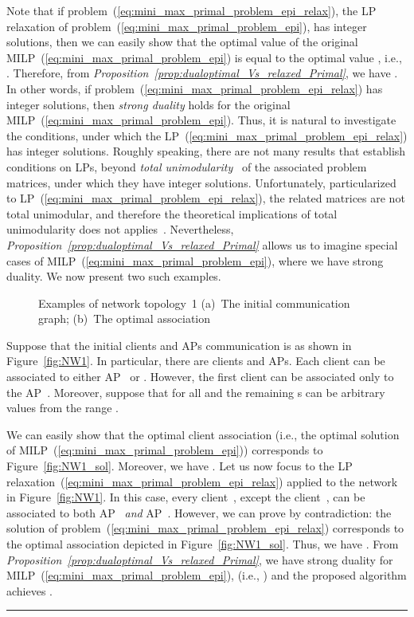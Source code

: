 \documentclass[journal, 10pt, twocolumn]{IEEEtran}
\newenvironment{Ex}
{\begin{adjustwidth}{0.04\linewidth}{0cm}
\begingroup\small
\vspace{-0.10em}
\raisebox{-.20em}{\rule{\linewidth}{0.3pt}}
\begin{example}
}
{
\end{example}
\vspace{-2mm}
\rule{\linewidth}{0.3pt}
\endgroup
\end{adjustwidth}}
\newcommand{\goodgapp}{\hspace{0.1\linewidth}} \newcommand{\goodgap}{\hspace{0.01\linewidth}} \newcommand{\KomM}[2]{{\textbf{{\color{blue!70!black}#1}}}{{\color{red!50!black}#2}}}
\begin{document}
Note that if problem~(\ref{eq:mini_max_primal_problem_epi_relax}), the LP relaxation of problem~(\ref{eq:mini_max_primal_problem_epi}), has integer solutions, then we can easily show that the optimal value  of the original MILP~(\ref{eq:mini_max_primal_problem_epi}) is equal to the optimal value , i.e., . Therefore, from \emph{Proposition~\ref{prop:dualoptimal_Vs_relaxed_Primal}}, we have . In other words, if problem~(\ref{eq:mini_max_primal_problem_epi_relax}) has integer solutions, then \emph{strong duality} holds for the original MILP~(\ref{eq:mini_max_primal_problem_epi}).
Thus, it is natural to investigate the conditions, under which the LP~(\ref{eq:mini_max_primal_problem_epi_relax}) has integer solutions. Roughly speaking, there are not many results that establish conditions on LPs, beyond \emph{total unimodularity}~\cite[\S~9]{Truemper-98} of the associated problem matrices, under which they have integer solutions. Unfortunately, particularized to LP~(\ref{eq:mini_max_primal_problem_epi_relax}), the related matrices are not total unimodular, and therefore the theoretical implications of total unimodularity does not applies~\cite[\S~9]{Truemper-98}. Nevertheless, \emph{Proposition~\ref{prop:dualoptimal_Vs_relaxed_Primal}} allows us to imagine special cases of MILP~(\ref{eq:mini_max_primal_problem_epi}), where we have strong duality. We now present two such examples.

\begin{figure}[t]
\centering
{}
\goodgapp
{}\vspace{-2mm}
\caption{Examples of network topology~1 (a)~The initial communication graph; (b)~The optimal association}
\label{fig:NW1_and_sol}
\vspace{-3.0mm}
\end{figure}

\begin{Ex}\label{ex:network1}
Suppose that the initial clients and APs communication is as shown in Figure~\ref{fig:NW1}. In particular, there are  clients and  APs. Each client  can be associated to either AP~ or . However, the first client can be associated only to the AP~. Moreover, suppose that  for all  and the remaining s can be arbitrary values from the range .

We can easily show that the optimal client association (i.e., the optimal solution of MILP~(\ref{eq:mini_max_primal_problem_epi})) corresponds to Figure~\ref{fig:NW1_sol}. Moreover, we have . Let us now focus to the LP relaxation~(\ref{eq:mini_max_primal_problem_epi_relax}) applied to the network in Figure~\ref{fig:NW1}. In this case, every client~, except the client~, can be associated to both AP~ \emph{and} AP~. However, we can prove by contradiction: the solution of problem~(\ref{eq:mini_max_primal_problem_epi_relax}) corresponds to the optimal association depicted in Figure~\ref{fig:NW1_sol}. Thus, we have . From \emph{Proposition~\ref{prop:dualoptimal_Vs_relaxed_Primal}}, we have strong duality for MILP~(\ref{eq:mini_max_primal_problem_epi}), (i.e., ) and the proposed algorithm achieves .
\end{Ex}
\end{document}
